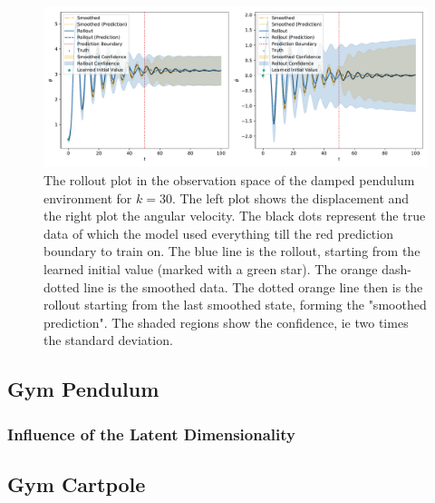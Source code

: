 			\begin{figure}
				\centering
				\includegraphics[width=\linewidth]{figures/results/pendulum-damped/run-latent-dim-30/rollout-observations-N0.pdf}
				\caption{The rollout plot in the observation space of the damped pendulum environment for \(k = 30\). The left plot shows the displacement and the right plot the angular velocity. The black dots represent the true data of which the model used everything till the red prediction boundary to train on. The blue line is the rollout, starting from the learned initial value (marked with a green star). The orange dash-dotted line is the smoothed data. The dotted orange line then is the rollout starting from the last smoothed state, forming the "smoothed prediction". The shaded regions show the confidence, \ac{ie} two times the standard deviation.}
				\label{fig:pendulumDampedRolloutL30}
			\end{figure}

	\subsection{Gym Pendulum}

		\subsubsection{Influence of the Latent Dimensionality}


	\subsection{Gym Cartpole}

